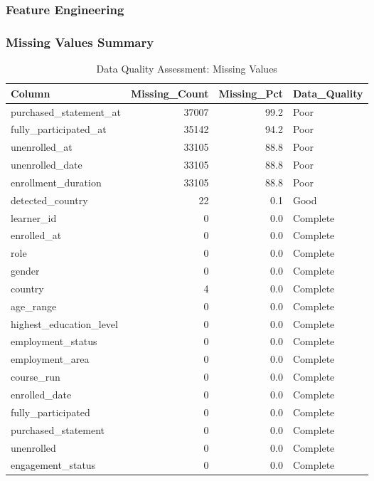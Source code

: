 \documentclass[
]{article}
\begin{document}
\subsubsection{Feature Engineering}\label{feature-engineering}

\subsubsection{Missing Values Summary}\label{missing-values-summary}

\begin{longtable}[t]{lrrl}
\caption{\label{tab:missing-values}Data Quality Assessment: Missing Values}\\
\toprule
Column & Missing\_Count & Missing\_Pct & Data\_Quality\\
\midrule
purchased\_statement\_at & 37007 & 99.2 & Poor\\
fully\_participated\_at & 35142 & 94.2 & Poor\\
unenrolled\_at & 33105 & 88.8 & Poor\\
unenrolled\_date & 33105 & 88.8 & Poor\\
enrollment\_duration & 33105 & 88.8 & Poor\\
\addlinespace
detected\_country & 22 & 0.1 & Good\\
learner\_id & 0 & 0.0 & Complete\\
enrolled\_at & 0 & 0.0 & Complete\\
role & 0 & 0.0 & Complete\\
gender & 0 & 0.0 & Complete\\
\addlinespace
country & 4 & 0.0 & Complete\\
age\_range & 0 & 0.0 & Complete\\
highest\_education\_level & 0 & 0.0 & Complete\\
employment\_status & 0 & 0.0 & Complete\\
employment\_area & 0 & 0.0 & Complete\\
\addlinespace
course\_run & 0 & 0.0 & Complete\\
enrolled\_date & 0 & 0.0 & Complete\\
fully\_participated & 0 & 0.0 & Complete\\
purchased\_statement & 0 & 0.0 & Complete\\
unenrolled & 0 & 0.0 & Complete\\
\addlinespace
engagement\_status & 0 & 0.0 & Complete\\
\bottomrule
\end{longtable}
\end{document}
